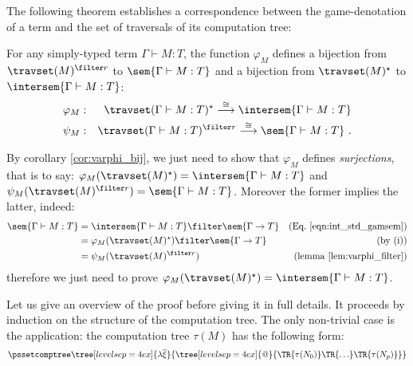The following theorem establishes a correspondence between the
game-denotation of a term and the set of traversals of its
computation tree:
\begin{theorem}
\label{thm:correspondence}
 For any simply-typed term $\Gamma \vdash M :T$,
the function $\varphi_M$ defines a bijection from $\travset(M)^{\filter
r}$ to $\sem{\Gamma \vdash M : T}$ and a bijection from
$\travset(M)^\star$ to $\intersem{\Gamma \vdash M : T}$:
\begin{eqnarray*}
 \varphi_M  &:& \travset(\Gamma \vdash M : T)^\star \stackrel{\cong}{\longrightarrow} \intersem{\Gamma \vdash M :T} \\
 \psi_M  &:& \travset(\Gamma \vdash M : T)^{\filter r} \stackrel{\cong}{\longrightarrow} \sem{\Gamma \vdash M :T} \ .
\end{eqnarray*}

\end{theorem}

\begin{remark}
\label{rem:corresp_proofreduction}
    By corollary \ref{cor:varphi_bij}, we just need to show that
    $\varphi_M$ defines \emph{surjections}, that is to
    say: $\varphi_M(\travset(M)^\star) = \intersem{\Gamma \vdash M : T}$
    and $\psi_M(\travset(M)^{\filter r}) = \sem{\Gamma \vdash M : T}$.
    Moreover the former implies the latter, indeed:
    \begin{align*}
    \sem{\Gamma \vdash M : T} &= \intersem{\Gamma \vdash M : T} \filter \sem{\Gamma \rightarrow T} & \mbox{(Eq.\ \ref{eqn:int_std_gamsem})} \\
            &= \varphi_M(\travset(M)^\star) \filter \sem{\Gamma \rightarrow T} & \mbox{(by (i))}\\
            &= \psi_M(\travset(M)^{\filter r}) & \mbox{(lemma \ref{lem:varphi_filter})}
    \end{align*}
    therefore we just need to prove $\varphi_M(\travset(M)^\star) = \intersem{\Gamma \vdash M : T}$.
\end{remark}
\smallskip

    Let us give an overview of the proof before giving it in full details.
    It proceeds by induction on the structure of the computation tree.
    The only non-trivial case is the application: the computation tree
    $\tau(M)$ has the following form:
        $$ \pssetcomptree\tree[levelsep=4ex]{\lambda \overline{\xi}}
            { \tree[levelsep=4ex]{@}
                {   \TR{\tau(N_0)} \TR{\ldots} \TR{\tau(N_p)}}}
        $$

